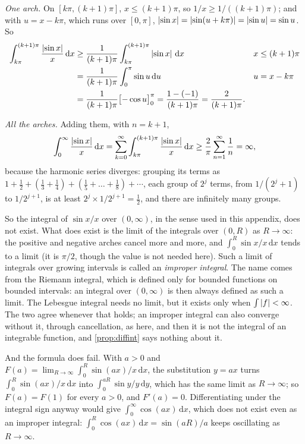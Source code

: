 \emph{One arch.} On $[k\pi,(k+1)\pi]$, $x\le(k+1)\pi$, so
$1/x\ge1/((k+1)\pi)$; and with $u=x-k\pi$, which runs over $[0,\pi]$,
$\left\lvert \sin x\right\rvert=\left\lvert \sin(u+k\pi)\right\rvert=\left\lvert \sin u\right\rvert=\sin u$. So
\begin{align*}
  \int_{k\pi}^{(k+1)\pi}\frac{\left\lvert \sin x\right\rvert}x\,\mathrm dx
  &\ge\frac1{(k+1)\pi}\int_{k\pi}^{(k+1)\pi}\left\lvert \sin x\right\rvert\,\mathrm dx
  &&x\le(k+1)\pi\\
  &=\frac1{(k+1)\pi}\int_0^\pi\sin u\,\mathrm du
  &&u=x-k\pi\\
  &=\frac1{(k+1)\pi}\bigl[-\cos u\bigr]_0^\pi
   =\frac{1-(-1)}{(k+1)\pi}=\frac2{(k+1)\pi} .
\end{align*}

\emph{All the arches.} Adding them, with $n=k+1$,
\[
  \int_0^\infty\frac{\left\lvert \sin x\right\rvert}x\,\mathrm dx
  =\sum_{k=0}^\infty\int_{k\pi}^{(k+1)\pi}\frac{\left\lvert \sin x\right\rvert}x\,\mathrm dx
  \ge\frac2\pi\sum_{n=1}^\infty\frac1n=\infty,
\]
because the harmonic series diverges: grouping its terms as
$1+\tfrac12+(\tfrac13+\tfrac14)+(\tfrac15+\dots+\tfrac18)+\cdots$, each
group of $2^j$ terms, from $1/(2^j+1)$ to $1/2^{j+1}$, is at least
$2^j\times1/2^{j+1}=\tfrac12$, and there are infinitely many groups.

So the integral of $\sin x/x$ over $(0,\infty)$,
in the sense used in this appendix, does not exist. What does exist is
the limit of the integrals over $(0,R)$ as $R\to\infty$: the positive and
negative arches cancel more and more, and
$\int_0^R\sin x/x\,\mathrm dx$ tends to a limit (it is $\pi/2$, though
the value is not needed here). Such a limit of integrals over growing intervals is called an
\emph{improper integral}. The name comes from the Riemann integral, which
is defined only for bounded functions on bounded intervals: an integral
over $(0,\infty)$ is then always defined as such a limit. The Lebesgue
integral needs no limit, but it exists only when $\int\left\lvert f\right\rvert<\infty$.
The two agree whenever that holds; an improper integral can also
converge without it, through cancellation, as here, and then it is not
the integral of an integrable function, and \cref{prop:diffint} says
nothing about it.

And the formula does fail. With $a>0$ and
$F(a)=\lim_{R\to\infty}\int_0^R\sin(ax)/x\,\mathrm dx$, the substitution
$y=ax$ turns $\int_0^R\sin(ax)/x\,\mathrm dx$ into
$\int_0^{aR}\sin y/y\,\mathrm dy$, which has the same limit as
$R\to\infty$; so $F(a)=F(1)$ for every $a>0$, and $F'(a)=0$.
Differentiating under the integral sign anyway would give
$\int_0^\infty\cos(ax)\,\mathrm dx$, which does not exist even as an
improper integral: $\int_0^R\cos(ax)\,\mathrm dx=\sin(aR)/a$ keeps
oscillating as $R\to\infty$.

